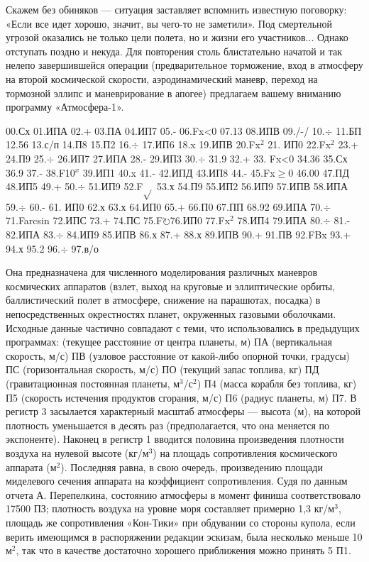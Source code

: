 \documentclass[11pt,a4paper,oneside]{article}
\def\FO{F$\circlearrowright$}
\begin{document}
Скажем без обиняков — ситуация заставляет вспомнить известную поговорку: «Если все идет хорошо, значит, вы чего-то не заметили». Под смертельной угрозой оказались не только цели полета, но и жизни его участников... Однако отступать поздно и некуда. Для повторения столь блистательно начатой и так нелепо завершившейся операции (предварительное торможение, вход в атмосферу на второй космической скорости, аэродинамический маневр, переход на тормозной эллипс и маневрирование в апогее) предлагаем вашему вниманию программу «Атмосфера-1».

00.Сх 01.ИПА 02.+ 03.ПА 04.ИП7 05.- 06.Fx<0 07.13 08.ИПВ 09./-/ 10.$\div$ 11.БП 12.56 13.с/п 14.П8 15.П2 16.$\div$ 17.ИП6 18.x 19.ИПВ 20.Fx$^{2}$ 21. ИП0 22.Fx$^{2}$ 23.+ 24.П9 25.$\div$ 26.ИП7 27.ИПА 28.- 29.ИП3 30.$\div$ 31.9 32.+ 33. Fx<0 34.36 35.Сх 36.9 37.- 38.F10$^{x}$ 39.ИП1 40.x 41.- 42.ИПД 43.ИП8 44.- 45.Fx$\geq$0 46.00 47.ПД 48.ИП5 49.+ 50.$\div$ 51.ИП9 52.F$\sqrt{}$ 53.х 54.П9 55.ИП2 56.ИП9 57.ИПВ 58.ИПА 59.$\div$ 60.- 61. ИП0 62.х 63.х 64.ИП0 65.+ 66.П0 67.ПП 68.92 69.ИПА 70.$\div$ 71.Farcsin 72.ИПС 73.+ 74.ПС 75.\FO 76.ИП0 77.Fx$^{2}$ 78.ИП4 79.ИПА 80.$\div$ 81.- 82.ИПА 83.$\div$ 84.ИП9 85.ИПВ 86.х 87.+ 88.х 89.ИПВ 90.+ 91.ПВ 92.FBx 93.+ 94.х 95.2 96.$\div$ 97.в/о

Она предназначена для численного моделирования различных маневров космических аппаратов (взлет, выход на круговые и эллиптические орбиты, баллистический полет в атмосфере, снижение на парашютах, посадка) в непосредственных окрестностях планет, окруженных газовыми оболочками. Исходные данные частично совпадают с теми, что использовались в предыдущих программах: (текущее расстояние от центра планеты, м) ПА (вертикальная скорость, м/с) ПВ (узловое расстояние от какой-либо опорной точки, градусы) ПС (горизонтальная скорость, м/с) ПО (текущий запас топлива, кг)
ПД (гравитационная постоянная планеты, м$^{3}$/с$^{2}$) П4 (масса корабля без топлива, кг) П5 (скорость истечения продуктов сгорания, м/с) П6 (радиус планеты, м) П7. В регистр 3 засылается характерный масштаб атмосферы — высота (м), на которой плотность уменьшается в десять раз (предполагается, что она меняется по экспоненте). Наконец в регистр 1 вводится половина произведения плотности воздуха на нулевой высоте (кг/м$^{3}$) на площадь сопротивления космического аппарата (м$^{2}$). Последняя равна, в свою очередь, произведению площади миделевого сечения аппарата на коэффициент сопротивления. Судя по данным отчета А. Перепелкина, состоянию атмосферы в момент финиша соответствовало 17500 ПЗ; плотность воздуха на уровне моря составляет примерно 1,3 кг/м$^{3}$, площадь же сопротивления «Кон-Тики» при обдувании со стороны купола, если верить имеющимся в распоряжении редакции эскизам, была несколько меньше 10 м$^{2}$, так что в качестве достаточно хорошего приближения можно принять 5 П1.
\end{document}
